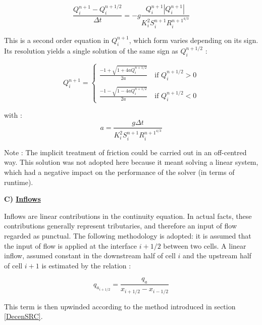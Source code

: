 \begin{equation}
 \frac{Q_{i}^{n+1}-Q_{i}^{n+1/2}}{\Delta t} = -g \frac{Q_{i}^{n+1}|Q_{i}^{n+1}|}{K_{i}^2 S_{i}^{n+1} R_{i}^{n+1^{4/3}}}
\end{equation}

This is a second order equation in $Q_{i}^{n+1}$, which form varies depending on its sign. Its resolution yields a single solution of the same sign as $Q_i^{n+1/2}$ :

\begin{equation}
Q_{i}^{n+1} = \left \lbrace
  \begin{array}{l}
    \frac{-1+\sqrt{1+4aQ_{i}^{n+1/2}}}{2a} \quad \mbox{if } Q_{i}^{n+1/2} > 0\\
    \\
    \frac{-1-\sqrt{1-4aQ_{i}^{n+1/2}}}{2a} \quad \mbox{if } Q_{i}^{n+1/2} < 0
  \end{array}
 \right.
\end{equation}

with :
\begin{equation}
 a = \frac{g \Delta t}{K_{i}^2 S_{i}^{n+1} R_{i}^{n+1^{4/3}}}
\end{equation}

\begin{CommentBlock}{Note :}
The implicit treatment of friction could be carried out in an off-centred way. This solution was not adopted here because it meant solving a linear system, which had a negative impact on the performance of the solver (in terms of runtime).
\end{CommentBlock}

\textbf{C) \underline{Inflows}}

Inflows are linear contributions in the continuity equation. In actual facts, these contributions generally represent tributaries, and therefore an input of flow regarded as punctual. The following methodology is adopted: it is assumed that the input of flow is applied at the interface $i+1/2$ between two cells. A linear inflow, assumed constant in the downstream half of cell $i$ and the upstream half of cell $i+1$ is estimated by the relation :

\begin{equation}
 q_{a_{i+1/2}} = \frac{q_a}{x_{i+1/2}-x_{i-1/2}}
\end{equation}

This term is then upwinded according to the method introduced in section \ref{DecenSRC}.


